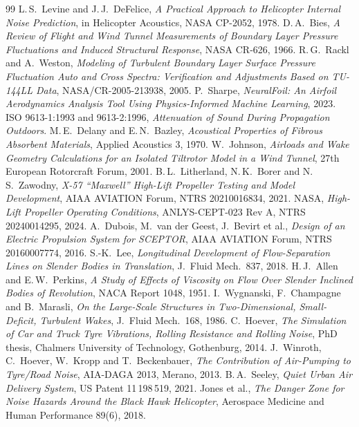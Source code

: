 \documentclass[10pt,a4paper,twocolumn]{article}
\begin{document}
\begin{thebibliography}{99}
 L.\,S.\ Levine and J.\,J.\ DeFelice, \emph{A Practical Approach to Helicopter Internal Noise Prediction}, in Helicopter Acoustics, NASA CP-2052, 1978.
 D.\,A.\ Bies, \emph{A Review of Flight and Wind Tunnel Measurements of Boundary Layer Pressure Fluctuations and Induced Structural Response}, NASA CR-626, 1966.
 R.\,G.\ Rackl and A.\ Weston, \emph{Modeling of Turbulent Boundary Layer Surface Pressure Fluctuation Auto and Cross Spectra: Verification and Adjustments Based on TU-144LL Data}, NASA/CR-2005-213938, 2005.
 P.\ Sharpe, \emph{NeuralFoil: An Airfoil Aerodynamics Analysis Tool Using Physics-Informed Machine Learning}, 2023.
 ISO 9613-1:1993 and 9613-2:1996, \emph{Attenuation of Sound During Propagation Outdoors}.
 M.\,E.\ Delany and E.\,N.\ Bazley, \emph{Acoustical Properties of Fibrous Absorbent Materials}, Applied Acoustics 3, 1970.
 W.\ Johnson, \emph{Airloads and Wake Geometry Calculations for an Isolated Tiltrotor Model in a Wind Tunnel}, 27th European Rotorcraft Forum, 2001.
 B.\,L.\ Litherland, N.\,K.\ Borer and N.\,S.\ Zawodny, \emph{X-57 ``Maxwell'' High-Lift Propeller Testing and Model Development}, AIAA AVIATION Forum, NTRS 20210016834, 2021.
 NASA, \emph{High-Lift Propeller Operating Conditions}, ANLYS-CEPT-023 Rev A, NTRS 20240014295, 2024.
 A.\ Dubois, M.\ van der Geest, J.\ Bevirt et al., \emph{Design of an Electric Propulsion System for SCEPTOR}, AIAA AVIATION Forum, NTRS 20160007774, 2016.
 S.-K.\ Lee, \emph{Longitudinal Development of Flow-Separation Lines on Slender Bodies in Translation}, J.\ Fluid Mech.\ 837, 2018.
 H.\,J.\ Allen and E.\,W.\ Perkins, \emph{A Study of Effects of Viscosity on Flow Over Slender Inclined Bodies of Revolution}, NACA Report 1048, 1951.
 I.\ Wygnanski, F.\ Champagne and B.\ Marasli, \emph{On the Large-Scale Structures in Two-Dimensional, Small-Deficit, Turbulent Wakes}, J.\ Fluid Mech.\ 168, 1986.
 C.\ Hoever, \emph{The Simulation of Car and Truck Tyre Vibrations, Rolling Resistance and Rolling Noise}, PhD thesis, Chalmers University of Technology, Gothenburg, 2014.
 J.\ Winroth, C.\ Hoever, W.\ Kropp and T.\ Beckenbauer, \emph{The Contribution of Air-Pumping to Tyre/Road Noise}, AIA-DAGA 2013, Merano, 2013.
 B.\,A.\ Seeley, \emph{Quiet Urban Air Delivery System}, US Patent 11\,198\,519, 2021.
 Jones et al., \emph{The Danger Zone for Noise Hazards Around the Black Hawk Helicopter}, Aerospace Medicine and Human Performance 89(6), 2018.
\end{thebibliography}
\end{document}
